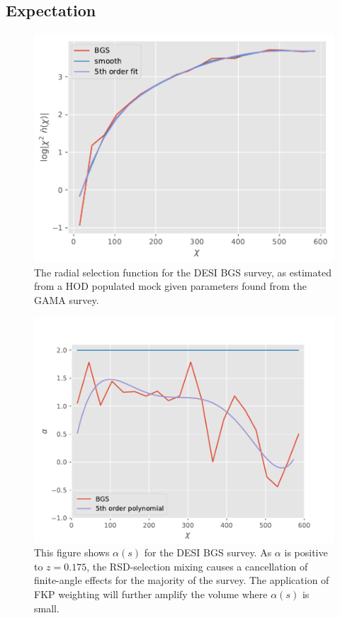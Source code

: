 \documentclass[useAMS,usenatbib]{mn2e}
\begin{document}
\subsection{Expectation}
\begin{figure}
    \centering
    \includegraphics[scale=0.55]{BGS_nx.pdf}
    \caption{The radial selection function for the DESI BGS survey, as estimated from a HOD populated mock given parameters found from the GAMA survey.}
    \label{fig:nx}
\end{figure}
\begin{figure}
    \centering
    \includegraphics[scale=0.55]{BGS_alpha.pdf}
    \caption{This figure shows $\alpha(s)$ for the DESI BGS survey.  As $\alpha$ is positive to $z=0.175$, the RSD-selection mixing causes a cancellation of finite-angle effects for the majority of the survey.  The application of FKP weighting will further amplify the volume where $\alpha(s)$ is small.}
    \label{fig:alpha}
\end{figure}
\end{document}
